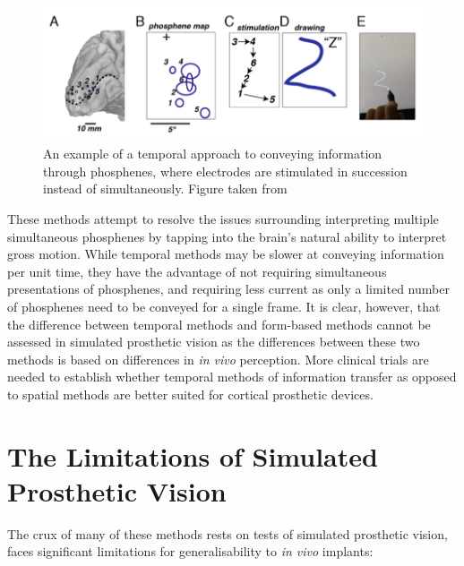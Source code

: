\documentclass[a4paper,11pt,openany]{book}
\begin{document}
\begin{figure}[htbp]
\centering
\includegraphics[width=.9\linewidth]{./graphics/litreview/temporal.png}
\caption{\label{fig:org197f318}
An example of a temporal approach to conveying information through phosphenes, where electrodes are stimulated in succession instead of simultaneously. Figure taken from \cite{beauchamp_dynamic_2018}}
\end{figure}

These methods attempt to resolve the issues surrounding interpreting multiple simultaneous phosphenes by tapping into the brain's natural ability to interpret gross motion. \cite{grossman_brain_2002}
While temporal methods may be slower at conveying information per unit time, they have the advantage of not requiring simultaneous presentations of phosphenes, and requiring less current as only a limited number of phosphenes need to be conveyed for a single frame.
It is clear, however, that the difference between temporal methods and form-based methods cannot be assessed in simulated prosthetic vision as the differences between these two methods is based on differences in \emph{in vivo} perception.
More clinical trials are needed to establish whether temporal methods of information transfer as opposed to spatial methods are better suited for cortical prosthetic devices.

\section*{The Limitations of Simulated Prosthetic Vision}
\label{sec:orge284c25}

The crux of many of these methods rests on tests of simulated prosthetic vision, faces significant limitations for generalisability to \emph{in vivo} implants:
\end{document}
